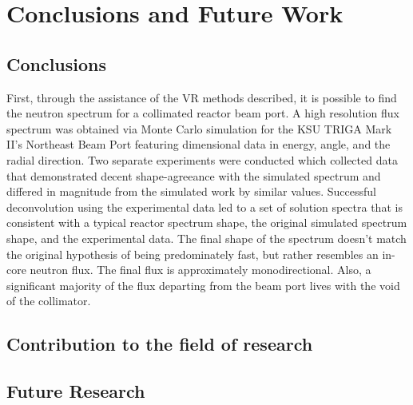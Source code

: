 
\cleardoublepage


\chapter{Conclusions and Future Work}

\section{Conclusions}
First, through the assistance of the VR methods described, it is possible to find the neutron spectrum for a collimated reactor beam port.
A high resolution flux spectrum was obtained via Monte Carlo simulation for the KSU TRIGA Mark II's Northeast Beam Port featuring dimensional data in energy, angle, and the radial direction.
Two separate experiments were conducted which collected data that demonstrated decent shape-agreeance with the simulated spectrum and differed in magnitude from the simulated work by similar values.
Successful deconvolution using the experimental data led to a set of solution spectra that is consistent with a typical reactor spectrum shape, the original simulated spectrum shape, and the experimental data.
The final shape of the spectrum doesn't match the original hypothesis of being predominately fast, but rather resembles an in-core neutron flux.
The final flux is approximately monodirectional.
Also, a significant majority of the flux departing from the beam port lives with the void of the collimator.



\section{Contribution to the field of research}




\section{Future Research}



